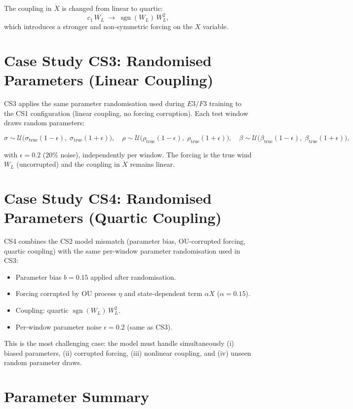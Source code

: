 \documentclass[11pt,a4paper]{article}
\begin{document}
The coupling in $\dot X$ is changed from linear to quartic:
\[
c_1\,W_L \;\longrightarrow\; \operatorname{sgn}(W_L)\,W_L^2,
\]
which introduces a stronger and non-symmetric forcing on the $X$ variable.

\section{Case Study CS3: Randomised Parameters (Linear Coupling)}

CS3 applies the same parameter randomisation used during $E3/F3$ training to the CS1 configuration (linear coupling, no forcing corruption). Each test window draws random parameters:

\[
\sigma \sim \mathcal{U}\bigl(\sigma_{\text{true}}(1 - \epsilon),\;\sigma_{\text{true}}(1 + \epsilon)\bigr),\quad
\rho \sim \mathcal{U}\bigl(\rho_{\text{true}}(1 - \epsilon),\;\rho_{\text{true}}(1 + \epsilon)\bigr),\quad
\beta \sim \mathcal{U}\bigl(\beta_{\text{true}}(1 - \epsilon),\;\beta_{\text{true}}(1 + \epsilon)\bigr),
\]

with $\epsilon = 0.2$ (20\% noise), independently per window. The forcing is the true wind $W_L$ (uncorrupted) and the coupling in $\dot X$ remains linear.

\section{Case Study CS4: Randomised Parameters (Quartic Coupling)}

CS4 combines the CS2 model mismatch (parameter bias, OU-corrupted forcing, quartic coupling) with the same per-window parameter randomisation used in CS3:

\begin{itemize}[noitemsep]
\item Parameter bias $b = 0.15$ applied after randomisation.
\item Forcing corrupted by OU process $\eta$ and state-dependent term $\alpha X$ ($\alpha = 0.15$).
\item Coupling: quartic $\operatorname{sgn}(W_L)\,W_L^2$.
\item Per-window parameter noise $\epsilon = 0.2$ (same as CS3).
\end{itemize}

This is the most challenging case: the model must handle simultaneously (i) biased parameters, (ii) corrupted forcing, (iii) nonlinear coupling, and (iv) unseen random parameter draws.

\section{Parameter Summary}
\end{document}
